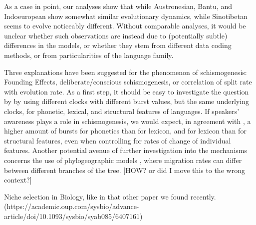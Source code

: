 \documentclass[a4paper,12pt]{scrartcl}
\begin{document}
As a case in point, our analyses show that while Austronesian, Bantu, and
Indoeuropean show somewhat similar evolutionary dynamics, while Sinotibetan
seems to evolve noticeably different. Without comparable analyses, it would be
unclear whether such observations are instead due to (potentially subtle)
differences in the models, or whether they stem from different data coding
methods, or from particularities of the language family.



Three explanations have been suggested for the phenomenon of schismogenesis:
Founding Effects, deliberate/conscious schismogenesis, or correlation of split
rate with evolution rate. As a first step, it should be easy to investigate the
question by \textcite{gray2013three} by using different clocks with different
burst values, but the same underlying clocks, for phonetic, lexical, and
structural features of languages. If speakers' awareness plays a role in
schismogenesis, we would expect, in agreement with , a
higher amount of bursts for phonetics than for lexicon, and for lexicon than for
structural features, even when controlling for rates of change of individual
features. Another potential avenue of further investigation into the mechanisms
concerns the use of phylogeographic models \parencite{neureitercan}, where
migration rates can differ between different branches of the tree. [HOW? or did I move this to the wrong context?]

Niche selection in Biology, like in that other paper we found recently.
(https://academic.oup.com/sysbio/advance-article/doi/10.1093/sysbio/syab085/6407161)


\printbibliography{}
\end{document}
